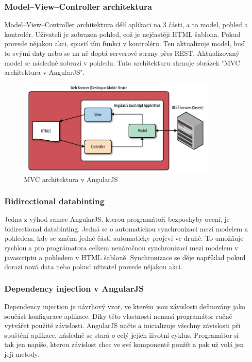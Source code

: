 \documentclass[czech,master,public,dept460,male,cpdeclaration,twoside]{diploma}
\begin{document}
\subsubsection{Model–View–Controller architektura}
Model–View–Controller architektura dělí aplikaci na 3 části, a to model, pohled a kontrolér. Uživateli je zobrazen pohled, což je nejčastěji HTML šablona. Pokud provede nějakou akci, spustí tím funkci v kontroléru. Ten aktualizuje model, buď to svými daty nebo se na ně doptá serverové strany přes REST. Aktualizovaný model se následně zobrazí v pohledu. Tuto architekturu shrnuje obrázek "MVC architektura v AngularJS".
\begin{figure}[H]
\centering\includegraphics[width=0.9\textwidth]{Figures/MVC.png}\caption{MVC architektura v AngularJS \cite{LearningAngularjs}}
\end{figure}

\subsubsection{Bidirectional databinting}
Jedna z výhod ramce AngularJS, kterou programátoři bezpochyby ocení, je bidirectional databinting. Jedná se o automatickou synchronizaci mezi modelem a pohledem, kdy se změna jedné části automaticky projeví ve druhé. To umožňuje rychlou a pro prográmatora celkem nenáročnou synchronizaci mezi modelem v javascriptu a pohledem v HTML šabloně. Synchronizace se děje například pokud dorazí nová data nebo pokud uživatel provede nějakou akci. \cite{databinding}

\subsubsection{Dependency injection v AngularJS}
Dependency injection je návrhový vzor, ve kterém jsou závislosti definovány jako součást konfigurace aplikace. Díky této vlastnosti nemusí programátor ručně vytvářet použité závislosti. AngularJS načte a inicializuje všechny závislosti při spuštění aplikace, následně se stará o celý jejich životní cyklus. Programátor si tak jen napíše, kterou závislost chce ve své komponentě použít a pak už volá jen její metody.
\end{document}
